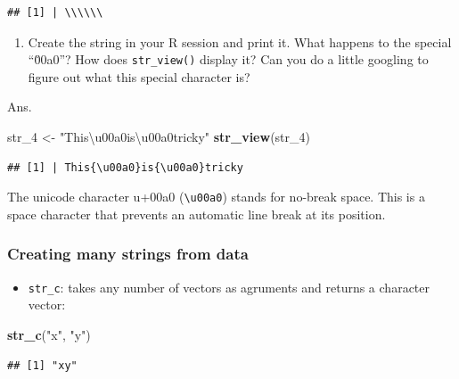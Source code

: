 \documentclass[
]{article}
\newenvironment{Shaded}{\begin{snugshade}}{\end{snugshade}}
\newcommand{\FunctionTok}[1]{\textcolor[rgb]{0.13,0.29,0.53}{\textbf{#1}}}
\newcommand{\NormalTok}[1]{#1}
\newcommand{\OtherTok}[1]{\textcolor[rgb]{0.56,0.35,0.01}{#1}}
\newcommand{\StringTok}[1]{\textcolor[rgb]{0.31,0.60,0.02}{#1}}
\providecommand{\tightlist}{%
  \setlength{\itemsep}{0pt}\setlength{\parskip}{0pt}}
\begin{document}
\begin{verbatim}
## [1] | \\\\\\
\end{verbatim}

\begin{enumerate}
\def\labelenumi{\arabic{enumi}.}
\setcounter{enumi}{1}
\tightlist
\item
  Create the string in your R session and print it. What happens to the
  special ``\u00a0''? How does \texttt{str\_view()} display it? Can you
  do a little googling to figure out what this special character is?
\end{enumerate}

Ans.

\begin{Shaded}
\begin{Highlighting}[]
\NormalTok{str\_4 }\OtherTok{\textless{}{-}} \StringTok{"This\textbackslash{}u00a0is\textbackslash{}u00a0tricky"}
\FunctionTok{str\_view}\NormalTok{(str\_4)}
\end{Highlighting}
\end{Shaded}

\begin{verbatim}
## [1] | This{\u00a0}is{\u00a0}tricky
\end{verbatim}

The unicode character u+00a0 (\texttt{\textbackslash{}u00a0}) stands for
no-break space. This is a space character that prevents an automatic
line break at its position.

\subsubsection{Creating many strings from
data}\label{creating-many-strings-from-data}

\begin{itemize}
\tightlist
\item
  \texttt{str\_c}: takes any number of vectors as agruments and returns
  a character vector:
\end{itemize}

\begin{Shaded}
\begin{Highlighting}[]
\FunctionTok{str\_c}\NormalTok{(}\StringTok{"x"}\NormalTok{, }\StringTok{"y"}\NormalTok{)}
\end{Highlighting}
\end{Shaded}

\begin{verbatim}
## [1] "xy"
\end{verbatim}
\end{document}
